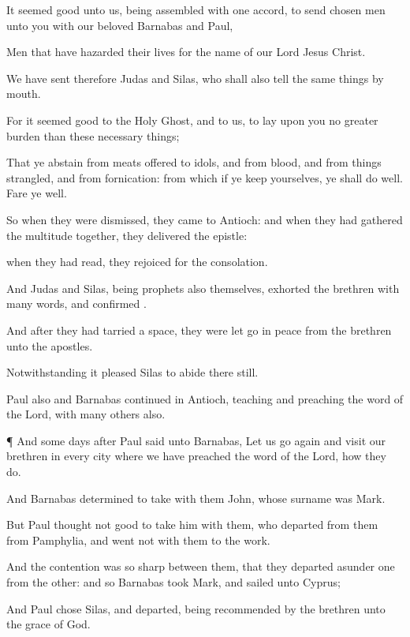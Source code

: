 {It seemed
good unto
us, being
assembled with one
accord, to
send
chosen
men
unto
you
with
our
beloved
Barnabas
and
Paul,

Men that have
hazarded
their
lives
for the
name of
our
Lord
Jesus
Christ.

We have
sent
therefore
Judas
and
Silas,
who
shall
also
tell
{} the same
things
by
mouth.

For it seemed
good to the
Holy
Ghost,
and to
us, to lay
upon
you
no
greater
burden
than
these
necessary
things;

That ye
abstain from meats offered to
idols,
and from
blood,
and from things
strangled,
and from
fornication:
from
which if ye
keep
yourselves, ye shall
do
well. Fare ye
well.

So
when they were
dismissed, they
came
to
Antioch:
and when they had
gathered the
multitude
together, they
delivered the
epistle:

when they had
read, they
rejoiced
for the
consolation.

And
Judas
and
Silas,
being
prophets
also
themselves,
exhorted the
brethren
with
many
words,
and
confirmed
{}.

And after they had
tarried
{} a
space, they were let
go
in
peace
from the
brethren
unto the
apostles.

Notwithstanding it
pleased
Silas to
abide
there
still.

Paul
also
and
Barnabas
continued
in
Antioch,
teaching
and
preaching the
word of the
Lord,
with
many
others
also.


\par }{\PP {}¶
And
some
days
after
Paul
said
unto
Barnabas, Let us go
again
and
visit
our
brethren
in
every
city
where we have
preached the
word of the
Lord,
{}
how they
do.

And
Barnabas
determined to take with
them
John, whose surname
was
Mark.

But
Paul
thought
not
good to take
him with
them,
who
departed
from
them
from
Pamphylia,
and
went
not with
them
to the
work.

And the
contention
was so sharp between
them,
that they departed
asunder
one
from the
other: and
so
Barnabas
took
Mark, and
sailed
unto
Cyprus;

And
Paul
chose
Silas, and
departed, being
recommended
by the
brethren unto the
grace of
God.

}
